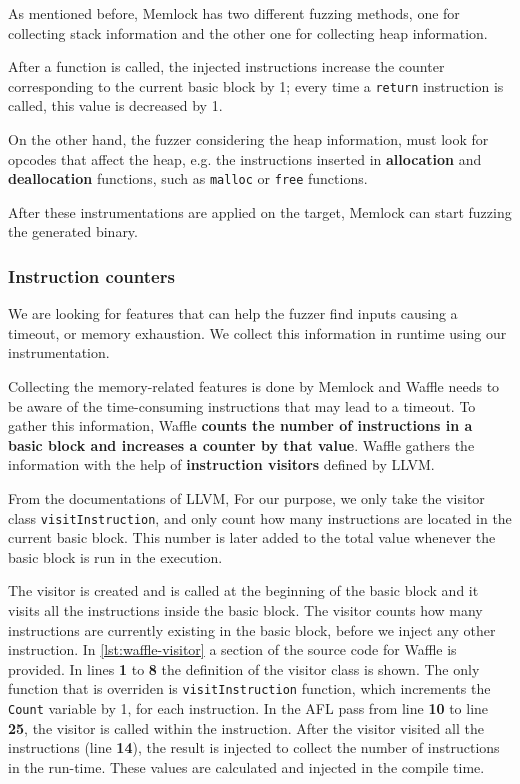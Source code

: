 As mentioned before, Memlock has two different fuzzing methods, one for collecting stack information and the other one for collecting heap information.

After a function is called, the injected instructions increase the counter corresponding to the current basic block by 1; every time a \texttt{return} instruction is called, this value is decreased by 1.

On the other hand, the fuzzer considering the heap information, must look for opcodes that affect the heap, e.g. the instructions inserted in \textbf{allocation} and \textbf{deallocation} functions, such as \texttt{malloc} or \texttt{free} functions.

After these instrumentations are applied on the target, Memlock can start fuzzing the generated binary.

\subsubsection{Instruction counters}

We are looking for features that can help the fuzzer find inputs causing a timeout, or memory exhaustion. We collect this information in runtime using our instrumentation.

Collecting the memory-related features is done by Memlock and Waffle needs to be aware of the time-consuming instructions that may lead to a timeout. To gather this information, Waffle \textbf{counts the number of instructions in a basic block and increases a counter by that value}. Waffle gathers the information with the help of \textbf{instruction visitors} defined by LLVM.

From the documentations of LLVM,  For our purpose, we only take the visitor class \texttt{visitInstruction}, and only count how many instructions are located in the current basic block. This number is later added to the total value whenever the basic block is run in the execution.

The visitor is created and is called at the beginning of the basic block and it visits all the instructions inside the basic block. The visitor counts how many instructions are currently existing in the basic block, before we inject any other instruction. In \ref{lst:waffle-visitor} a section of the source code for Waffle is provided. In lines \textbf{1} to \textbf{8} the definition of the visitor class is shown. The only function that is overriden is \texttt{visitInstruction} function, which increments the \texttt{Count} variable by 1, for each instruction. In the AFL pass from line \textbf{10} to line \textbf{25}, the visitor is called within the instruction. After the visitor visited all the instructions (line \textbf{14}), the result is injected to collect the number of instructions in the run-time. These values are calculated and injected in the compile time.

